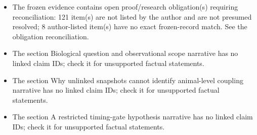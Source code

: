 \documentclass[11pt]{article}
\begin{document}
\begin{itemize}
\item The frozen evidence contains open proof/research obligation(s) requiring reconciliation: 121 item(s) are not listed by the author and are not presumed resolved; 8 author-listed item(s) have no exact frozen-record match. See the obligation reconciliation.
\item The section Biological question and observational scope narrative has no linked claim IDs; check it for unsupported factual statements.
\item The section Why unlinked snapshots cannot identify animal-level coupling narrative has no linked claim IDs; check it for unsupported factual statements.
\item The section A restricted timing-gate hypothesis narrative has no linked claim IDs; check it for unsupported factual statements.
\end{itemize}
\end{document}
